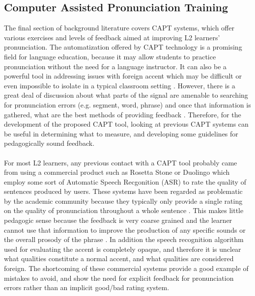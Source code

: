 \subsection{Computer Assisted Pronunciation Training}
The final section of background literature covers CAPT systems, which offer various exercises and levels of feedback aimed  at improving L2 learners' pronunciation. The automatization offered by CAPT technology is a promising field for language education, because it may allow students to practice pronunciation without the need for a language instructor. It can also be a powerful tool in addressing issues with foreign accent which may be difficult or even impossible to isolate in a typical classroom setting \cite{thomson2011computer}. However, there is a great deal of discussion about what parts of the signal are amenable to searching for pronunciation errors (e.g. segment, word, phrase) and once that information is gathered, what are the best methods of providing feedback \cite{hansen2006computer,neri2002pedagogy}.  Therefore, for the development of the proposed CAPT tool, looking at previous CAPT systems can be useful in determining what to measure, and developing some guidelines for pedagogically sound feedback.
\\
\\
For most L2 learners, any previous contact with a CAPT tool probably came from using a commercial product such as Rosetta Stone or Duolingo which employ some sort of Automatic Speech Recgonition (ASR) to rate the quality of sentences produced by users. These systems have been regarded as problematic by the academic community because they typically only provide a single rating on the quality of pronunciation throughout a whole sentence \citep{thomson2011computer}. This makes little pedagogic sense because the feedback is very coarse grained and the learner cannot use that information to improve the production of any specific sounds or the overall prosody of the phrase \cite{hansen2006computer}. In addition the speech recognition algorithm used for evaluating the accent is completely opaque, and therefore it is unclear what qualities constitute a normal accent, and what qualities are considered foreign. The shortcoming of these commercial systems provide a good example of mistakes to avoid, and show the need for explicit feedback for pronunciation errors rather than an implicit good/bad rating system.
\\
\\
